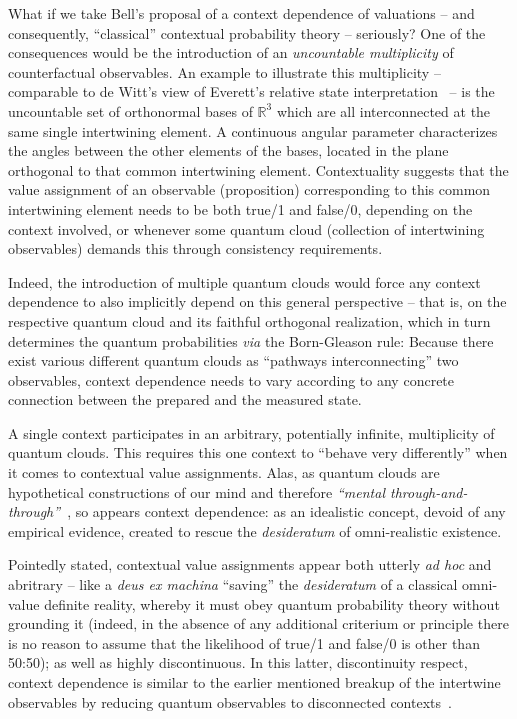 \documentclass[%
  twocolumn,
 showpacs,
 showkeys,
 preprintnumbers,
 amsmath,amssymb,
 aps,
  pra,
  longbibliography,
 ]{revtex4-1}
\begin{document}
What if we take Bell's proposal of a context dependence of valuations --
and consequently,
``classical'' contextual probability theory  -- seriously?
One of the consequences would be the introduction of an {\em uncountable multiplicity} of
counterfactual observables.
An example to illustrate this multiplicity -- comparable to de Witt's view of Everett's relative state
interpretation~\citep{everett-thesis} --  is the uncountable set of orthonormal bases of $\mathbb{R}^3$
which are all interconnected at the same single intertwining element.
A continuous angular parameter characterizes the angles between the other elements of the bases,
located in the plane orthogonal to that common intertwining element.
Contextuality suggests that the value assignment of an observable (proposition) corresponding
to this common intertwining element needs to be both true/1 and false/0, depending on the context involved,
or  whenever some quantum cloud
(collection of intertwining observables) demands
this through consistency requirements.

Indeed, the introduction of multiple quantum clouds would force any context dependence
to also implicitly depend on this general perspective --
that is, on the respective quantum cloud and its faithful orthogonal realization, which in turn determines
the quantum probabilities {\em via} the Born-Gleason rule:
Because there exist various different
quantum clouds as
``pathways interconnecting''  two observables, context dependence needs to vary according to any
concrete connection between the prepared and the measured state.

A single context participates in an arbitrary, potentially infinite, multiplicity of quantum clouds.
This requires this one context to ``behave very differently'' when it comes to contextual value assignments.
Alas, as quantum clouds are hypothetical constructions of our mind and therefore
{\em ``mental through-and-through''}~\citep{Goldschmidt2017-idealism-Ch3},
so appears context dependence: as an idealistic concept, devoid of any empirical evidence,
created to rescue the {\it desideratum} of omni-realistic existence.


Pointedly stated, contextual value assignments appear
both utterly {\it ad hoc} and abritrary -- like a {\it deus ex machina} ``saving''
the {\it desideratum} of a classical omni-value definite reality, whereby it must obey quantum probability theory
without grounding it
(indeed, in the absence of any additional criterium or principle there is no
reason to assume that the likelihood of
true/1 and false/0 is other than 50:50); as well as highly discontinuous.
In this latter, discontinuity respect, context dependence is similar to the earlier mentioned
breakup of the intertwine observables
by reducing quantum observables to disconnected contexts~\citep{godsil-zaks,meyer:99,havlicek-2000}.
\end{document}
